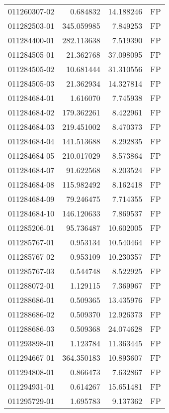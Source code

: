 \begin{tabular}{lrrl}
011260307-02 &    0.684832 &      14.188246 &   FP \\
011282503-01 &  345.059985 &       7.849253 &   FP \\
011284400-01 &  282.113638 &       7.519390 &   FP \\
011284505-01 &   21.362768 &      37.098095 &   FP \\
011284505-02 &   10.681444 &      31.310556 &   FP \\
011284505-03 &   21.362934 &      14.327814 &   FP \\
011284684-01 &    1.616070 &       7.745938 &   FP \\
011284684-02 &  179.362261 &       8.422961 &   FP \\
011284684-03 &  219.451002 &       8.470373 &   FP \\
011284684-04 &  141.513688 &       8.292835 &   FP \\
011284684-05 &  210.017029 &       8.573864 &   FP \\
011284684-07 &   91.622568 &       8.203524 &   FP \\
011284684-08 &  115.982492 &       8.162418 &   FP \\
011284684-09 &   79.246475 &       7.714355 &   FP \\
011284684-10 &  146.120633 &       7.869537 &   FP \\
011285206-01 &   95.736487 &      10.602005 &   FP \\
011285767-01 &    0.953134 &      10.540464 &   FP \\
011285767-02 &    0.953109 &      10.230357 &   FP \\
011285767-03 &    0.544748 &       8.522925 &   FP \\
011288072-01 &    1.129115 &       7.369967 &   FP \\
011288686-01 &    0.509365 &      13.435976 &   FP \\
011288686-02 &    0.509370 &      12.926373 &   FP \\
011288686-03 &    0.509368 &      24.074628 &   FP \\
011293898-01 &    1.123784 &      11.363445 &   FP \\
011294667-01 &  364.350183 &      10.893607 &   FP \\
011294808-01 &    0.866473 &       7.632867 &   FP \\
011294931-01 &    0.614267 &      15.651481 &   FP \\
011295729-01 &    1.695783 &       9.137362 &   FP \\

\end{tabular}
